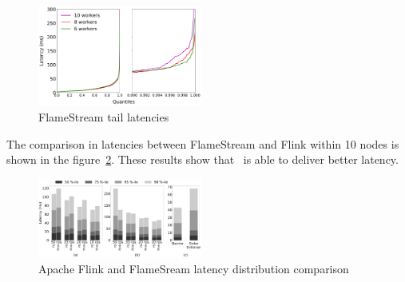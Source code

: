\begin{figure}[htbp]
  \centering
  \includegraphics[width=0.48\textwidth]{pics/fs-index-quantiles}
  \caption{FlameStream tail latencies}
  \label {fs-index-quantiles}
\end{figure}

The comparison in latencies between FlameStream and Flink within 10 nodes is shown in the figure~\ref{comp-index-quantiles}. These results show that \FlameStream\ is able to deliver better latency.

\begin{figure}[htbp]
  \centering
  \includegraphics[width=0.48\textwidth]{pics/comp-index-quantiles}
  \caption{Apache Flink and FlameSream latency distribution comparison}
  \label {comp-index-quantiles}
\end{figure}
